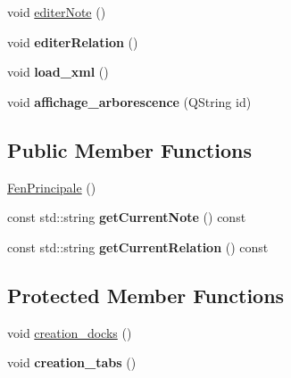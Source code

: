 \begin{DoxyCompactItemize}
void \hyperlink{class_fen_principale_ab8b916f06d0c149b1411781e7129fab5}{editer\+Note} ()
\item 
\mbox{\label{class_fen_principale_a03e9dfdb793047a0ff1a360324d3a251}} 
void {\bfseries editer\+Relation} ()
\item 
\mbox{\label{class_fen_principale_a60879a209bf90971f1919a685c9538dd}} 
void {\bfseries load\+\_\+xml} ()
\item 
\mbox{\label{class_fen_principale_adf2a7193704aaf0b73b5b10b3133488c}} 
void {\bfseries affichage\+\_\+arborescence} (Q\+String id)
\end{DoxyCompactItemize}
\subsection*{Public Member Functions}
\begin{DoxyCompactItemize}
\item 
\hyperlink{class_fen_principale_a529a35ea032da250ad37f7355d1388be}{Fen\+Principale} ()
\item 
\mbox{\label{class_fen_principale_a693e4a09cc7dd941184d0ea7860409da}} 
const std\+::string {\bfseries get\+Current\+Note} () const
\item 
\mbox{\label{class_fen_principale_afe1f6fbbdd799fa55e804343ce4583af}} 
const std\+::string {\bfseries get\+Current\+Relation} () const
\end{DoxyCompactItemize}
\subsection*{Protected Member Functions}
\begin{DoxyCompactItemize}
\item 
void \hyperlink{class_fen_principale_ab3ef99b1adb06c0bcc57ea74ca34923e}{creation\+\_\+docks} ()
\item 
\mbox{\label{class_fen_principale_aa5ea82e9b0e1c9f93d496cad531ca9e1}} 
void {\bfseries creation\+\_\+tabs} ()
\end{DoxyCompactItemize}
